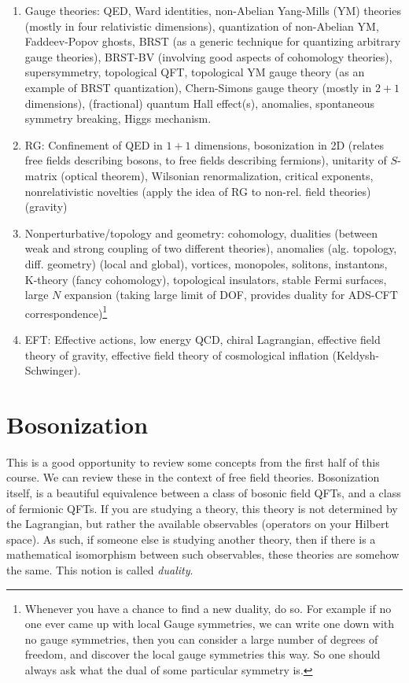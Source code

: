 \documentclass{booc}
\begin{document}
\begin{enumerate}
\item Gauge theories:
QED, Ward identities, 
non-Abelian Yang-Mills (YM) theories (mostly in four relativistic dimensions),
quantization of non-Abelian YM,
Faddeev-Popov ghosts, BRST (as a generic technique for quantizing arbitrary gauge theories),
BRST-BV (involving good aspects of cohomology theories),
supersymmetry,
topological QFT, topological YM gauge theory (as an example of BRST quantization),
Chern-Simons gauge theory (mostly in $2+1$ dimensions), 
(fractional) quantum Hall effect(s), 
anomalies, spontaneous symmetry breaking, Higgs mechanism.
\item RG:
Confinement of QED in $1+1$ dimensions,
bosonization in 2D (relates free fields describing bosons, to free fields describing fermions),
unitarity of $S$-matrix (optical theorem),
Wilsonian renormalization, critical exponents, 
nonrelativistic novelties (apply the idea of RG to non-rel. field theories)(gravity)
\item Nonperturbative/topology and geometry:
cohomology, dualities (between weak and strong coupling of two different theories),
anomalies (alg. topology, diff. geometry) (local and global),
vortices, monopoles, solitons, instantons,
K-theory (fancy cohomology), topological insulators, 
stable Fermi surfaces, 
large $N$ expansion 
(taking large limit of DOF, provides duality for ADS-CFT correspondence)\footnote{
Whenever you have a chance to find a new duality, do so.
For example if no one ever came up with local Gauge symmetries, 
we can write one down with no gauge symmetries, 
then you can consider a large number of degrees of freedom, 
and discover the local gauge symmetries this way. 
So one should always ask what the dual of some particular symmetry is.}
\item EFT:
Effective actions, low energy QCD, chiral Lagrangian, 
effective field theory of gravity, 
effective field theory of cosmological inflation
(Keldysh-Schwinger).
\end{enumerate}

\chapter{Bosonization}

This is a good opportunity to review some concepts from the first half of this course.
We can review these in the context of free field theories. 
Bosonization itself, is a beautiful equivalence 
between a class of bosonic field QFTs,
and a class of fermionic QFTs.
If you are studying a theory, this theory is not determined by the Lagrangian,
but rather the available observables (operators on your Hilbert space). 
As such, if someone else is studying another
theory, then if there is a mathematical isomorphism between such observables, 
these theories are somehow the same. 
This notion is called \emph{duality}.
\end{document}

